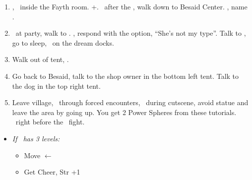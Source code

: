 \begin{enumerate}[resume]
	\item \cs[1:00], \sd\ inside the Fayth room. \fmv+\cs[1:00]. \sd\ after the \fmv, walk down to Besaid Center. \cs[1:40], name \valefor.
	\item \sd\ at party, walk to \yuna. \sd, respond with the  option, ``She's not my type''. Talk to \wakka, go to sleep, \sd\ on the dream docks.
	\item Walk out of tent, \sd.
	\item Go back to Besaid, talk to the shop owner in the bottom left tent. Talk to the dog in the top right tent.
	\item Leave village, \sd\ through forced encounters, \sd\ during cutscene, avoid statue and leave the area by going up. You get 2 Power Spheres from these tutorials. \skippablefmv\ right before the \kimahri\ fight.
\end{enumerate}
\begin{spheregrid}
	\begin{itemize}
		\item \textit{If \tidus\ has 3 levels:}
		      \begin{itemize}
			      \item Move $\leftarrow$
			      \item Get Cheer, Str +1
		      \end{itemize}
	\end{itemize}
\end{spheregrid}
